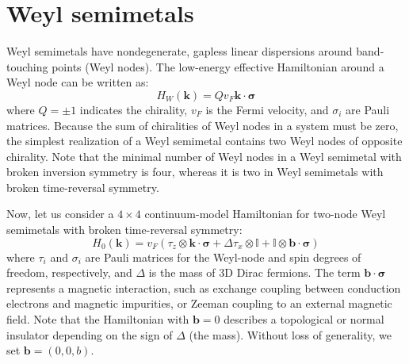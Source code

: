 \section{Weyl semimetals}

Weyl semimetals have nondegenerate, gapless linear dispersions around band-touching points (Weyl nodes). The low-energy effective Hamiltonian around a Weyl node can be written as:
\begin{equation}
H_W(\bm{k}) = Q v_F \bm{k} \cdot \bm{\sigma}
\end{equation}
where $Q=\pm 1$ indicates the chirality, $v_F$ is the Fermi velocity, and $\sigma_i$ are Pauli matrices. Because the sum of chiralities of Weyl nodes in a system must be zero, the simplest realization of a Weyl semimetal contains two Weyl nodes of opposite chirality. Note that the minimal number of Weyl nodes in a Weyl semimetal with broken inversion symmetry is four, whereas it is two in Weyl semimetals with broken time-reversal symmetry.

Now, let us consider a $4\times 4$ continuum-model Hamiltonian for two-node Weyl semimetals with broken time-reversal symmetry:
\begin{equation}
H_0(\bm{k}) = v_F (\tau_z \otimes \bm{k} \cdot \bm{\sigma} + \Delta \tau_x \otimes \mathbb{I} + \mathbb{I} \otimes \bm{b} \cdot \bm{\sigma})
\end{equation}
where $\tau_i$ and $\sigma_i$ are Pauli matrices for the Weyl-node and spin degrees of freedom, respectively, and $\Delta$ is the mass of 3D Dirac fermions. The term $\bm{b} \cdot \bm{\sigma}$ represents a magnetic interaction, such as exchange coupling between conduction electrons and magnetic impurities, or Zeeman coupling to an external magnetic field. Note that the Hamiltonian with $\bm{b}=0$ describes a topological or normal insulator depending on the sign of $\Delta$ (the mass). Without loss of generality, we set $\bm{b}=(0,0,b)$.

